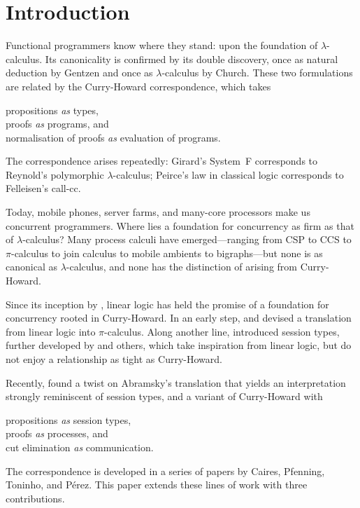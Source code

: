 \documentclass{jfp1}
\newcommand{\incolor}[1]{#1}    %
\newcommand{\judgecolor}{}
\newcommand{\typecolor}{}
\newcommand{\termcolor}{}
\newcommand{\Typecolor}{}
\newcommand{\Termcolor}{}
\newcommand{\colored}{
  \incolor{
    \renewcommand{\judgecolor}{\color{black}}
    \renewcommand{\typecolor}{\color{blue}}
    \renewcommand{\termcolor}{\color{red}}
    \renewcommand{\Typecolor}{\color{cyan}}
    \renewcommand{\Termcolor}{\color{magenta}}
  }
}
\newcommand{\tp}[1]{{\typecolor #1}}
\newcommand{\tighten}{\vspace{-1ex}}
\begin{document}
\section{Introduction}

Functional programmers know where they stand: upon the foundation of
$\lambda$-calculus.  Its canonicality is confirmed by its double discovery,
once as natural deduction by Gentzen and
once as $\lambda$-calculus by Church.
These two formulations are related by the Curry-Howard correspondence,
which takes
\tighten
\begin{center}\colored
\tp{propositions} \emph{as} \tp{types}, \\
\tp{proofs} \emph{as} \tp{programs}, and \\
\tp{normalisation of proofs} \emph{as} \tp{evaluation of programs}.
\end{center}
\tighten
The correspondence arises repeatedly:
Girard's System~F corresponds to Reynold's polymorphic $\lambda$-calculus;
Peirce's law in classical logic corresponds to Felleisen's call-cc.


Today, mobile phones, server farms, and many-core processors make us
concurrent programmers.  Where lies a foundation for concurrency as
firm as that of $\lambda$-calculus?  Many process calculi have
emerged---ranging from CSP to CCS to $\pi$-calculus to join calculus
to mobile ambients to bigraphs---but none is as canonical as
$\lambda$-calculus, and none has the distinction of arising from
Curry-Howard.

Since its inception by \citet{Girard87}, linear logic has held the promise
of a foundation for concurrency rooted in Curry-Howard.  In an early step,
\citet{Abramsky94} and \citet{BellinScott94} devised a
translation from linear logic into $\pi$-calculus.
Along another line,
\citet{Honda93} introduced session types,
further developed by \citet{HondaEtAl98} and others,
which take inspiration from linear logic, but do not enjoy
a relationship as tight as Curry-Howard. 

Recently, \citet{CairesPfenning10} found a twist on
Abramsky's translation that yields an interpretation
strongly reminiscent of session types, and a variant of
Curry-Howard with
\tighten
\begin{center}\colored
\tp{propositions} \emph{as} \tp{session types}, \\
\tp{proofs} \emph{as} \tp{processes}, and \\
\tp{cut elimination} \emph{as} \tp{communication}.
\end{center}
\tighten
The correspondence is developed in a series of papers
by Caires, Pfenning, Toninho, and P\'erez.
This paper extends these lines of work with three contributions.
\end{document}
